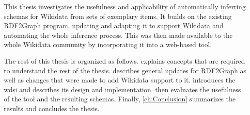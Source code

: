 This thesis investigates the usefulness and applicability
of automatically inferring \glspl{schema} for \gls{Wikidata} from sets of exemplary \glspl{item}.
It builds on the existing \gls{RDF2Graph} \cite{vanDam2015} program,
updating and adapting it to support \gls{Wikidata}
and automating the whole inference process.
This was then made available to the whole \gls{Wikidata} community %
by incorporating it into a web-based tool.

The rest of this thesis
is organized as follows.
 explains concepts that are required
to understand the rest of the thesis.
 describes general updates for \gls{RDF2Graph}
as well as changes that were made to add \gls{Wikidata} support to it.
 introduces the \gls{wdsi}
and describes its design and implementation.
 then evaluates the usefulness of the tool and the resulting \glspl{schema}.
Finally, \cref{ch:Conclusion} summarizes the results and concludes the thesis.
